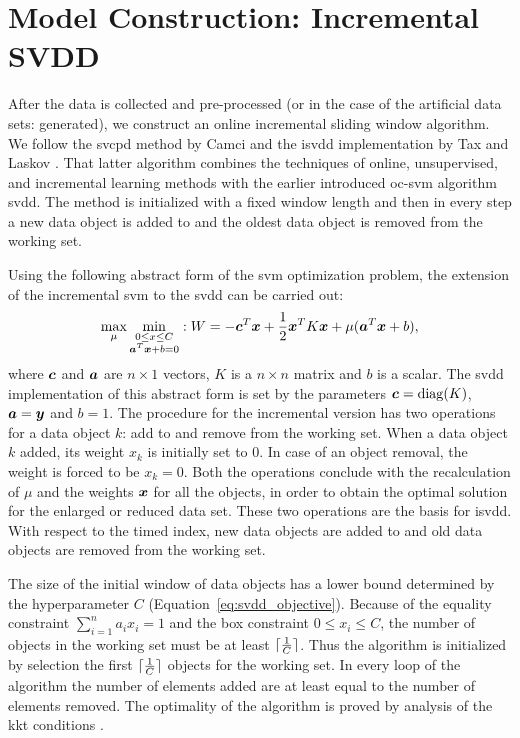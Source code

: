\section{Model Construction: Incremental SVDD}\label{sec:method_model_construction}
After the data is collected and pre-processed (or in the case of the artificial data sets: generated), we construct an online incremental sliding window algorithm.
We follow the \gls{svcpd} method by Camci \cite{camci2010change} and the \gls{isvdd} implementation by Tax and Laskov \cite{tax2003online}.
That latter algorithm combines the techniques of online, unsupervised, and incremental learning methods with the earlier introduced \gls{oc-svm} algorithm \gls{svdd}.
The method is initialized with a fixed window length and then in every step a new data object is added to and the oldest data object is removed from the working set.

Using the following abstract form of the \gls{svm} optimization problem, the extension of the incremental \gls{svm} to the \gls{svdd} can be carried out:
\begin{equation}
  \operatorname*{max}_\mu \operatorname*{min}_{\substack{
    0 \le x \le C \\
    \vectorsym{a}^T \vectorsym{x} + b = 0}
  } : W = -\vectorsym{c}^T\vectorsym{x} + \frac{1}{2}\vectorsym{x}^T K\vectorsym{x} + \mu(\vectorsym{a}^T\vectorsym{x} + b),
\end{equation}
where $\vectorsym{c}$ and $\vectorsym{a}$ are $n \times 1$ vectors, $K$ is a $n \times n$ matrix and $b$ is a scalar.
The \gls{svdd} implementation of this abstract form is set by the parameters $\vectorsym{c}=\operatorname*{diag}(K)$, $\vectorsym{a} = \vectorsym{y}$ and $b=1$.
The procedure for the incremental version has two operations for a data object $k$: add to and remove from the working set.
When a data object $k$ added, its weight $x_k$ is initially set to $0$.
In case of an object removal, the weight is forced to be $x_k=0$.
Both the operations conclude with the recalculation  of $\mu$ and the weights $\vectorsym{x}$ for all the objects, in order to obtain the optimal solution for the enlarged or reduced data set.
These two operations are the basis for \gls{isvdd}.
With respect to the timed index, new data objects are added to and old data objects are removed from the working set.

The size of the initial window of data objects has a lower bound determined by the hyperparameter $C$ (Equation~\ref{eq:svdd_objective}).
Because of the equality constraint $\sum_{i=1}^n a_i x_i = 1$ and the box constraint $0 \le x_i \le C$, the number of objects in the working set must be at least $\lceil\frac{1}{C}\rceil$.
Thus the algorithm is initialized by selection the first $\lceil\frac{1}{C}\rceil$ objects for the working set.
In every loop of the algorithm the number of elements added are at least equal to the number of elements removed.
The optimality of the algorithm is proved by analysis of the \gls{kkt} conditions \cite{tax2003online}.

